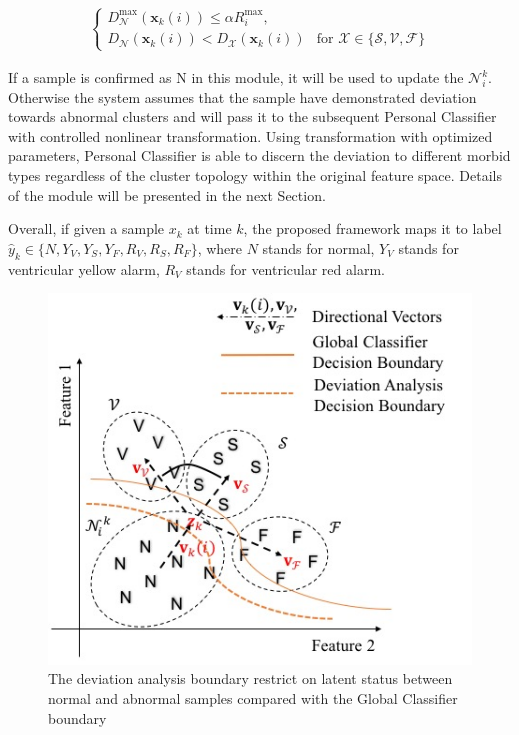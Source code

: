 \begin{align}\label{eq:condition1}
\begin{cases}
D_\mathcal{N}^{\max}(\mathbf{x}_k(i))  \leq\alpha R_i^{\max},\\
D_\mathcal{N}(\mathbf{x}_k(i)) < D_\mathcal{X}(\mathbf{x}_k(i)) &\text{for~} \mathcal{X}\in\{\mathcal{S},\mathcal{V},\mathcal{F}\}   %
\end{cases}
\end{align}

If a sample is confirmed as N in this module, it will be used to update the $\mathcal{N}_i^k$. Otherwise the system assumes that the sample have demonstrated deviation towards abnormal clusters and will pass it to the subsequent Personal Classifier with controlled nonlinear transformation. Using transformation with optimized parameters, Personal Classifier is able to discern the deviation to different morbid types regardless of the cluster topology within the original feature space. Details of the module will be presented in the next Section.

Overall, if given a sample $x_k$ at time $k$, the proposed framework maps it to label $\hat{y}_k \in \{N,Y_V,Y_S,Y_F,R_V,R_S,R_F\}$, where $N$ stands for normal, $Y_V$ stands for ventricular yellow alarm, $R_V$ stands for ventricular red alarm.

\begin{figure}[t]
\centering
\includegraphics[scale=.7]{Fig/topology.jpg}
\caption{The deviation analysis boundary restrict on latent status between normal and abnormal samples compared with the Global Classifier boundary}
\label{fig:topo_deviation}
\end{figure}


